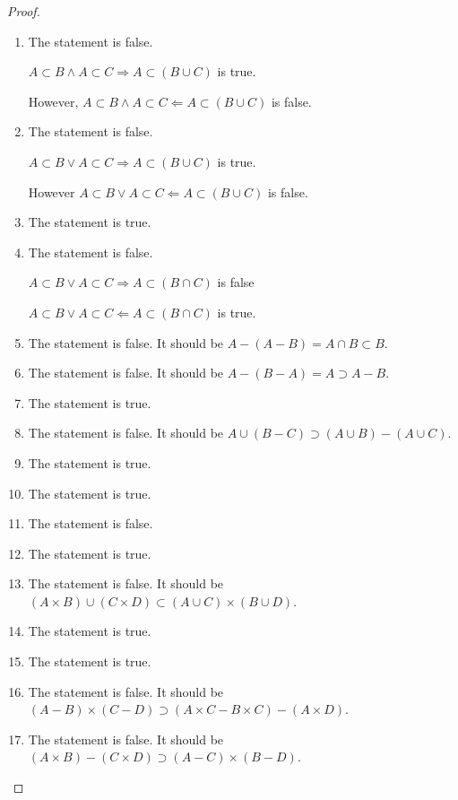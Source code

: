 \begin{proof}
    \begin{enumerate}[label={(\alph*)}]
        \item The statement is false.

              $A\subset B \land A\subset C \Rightarrow A\subset (B\cup C)$ is true.

              However, $A\subset B \land A\subset C \Leftarrow A\subset (B\cup C)$ is false.
        \item The statement is false.

              $A\subset B \lor A\subset C \Rightarrow A\subset (B\cup C)$ is true.

              However $A\subset B \lor A\subset C \Leftarrow A\subset (B\cup C)$ is false.
        \item The statement is true.
        \item The statement is false.

              $A\subset B\lor A\subset C \Rightarrow A\subset (B\cap C)$ is false

              $A\subset B\lor A\subset C \Leftarrow A\subset (B\cap C)$ is true.
        \item The statement is false. It should be $A - (A - B) = A\cap B\subset B$.
        \item The statement is false. It should be $A - (B - A) = A \supset A - B$.
        \item The statement is true.
        \item The statement is false. It should be $A\cup (B - C)\supset (A\cup B) - (A\cup C)$.
        \item The statement is true.
        \item The statement is true.
        \item The statement is false.
        \item The statement is true.
        \item The statement is false. It should be $(A\times B)\cup (C\times D) \subset (A\cup C)\times (B\cup D)$.
        \item The statement is true.
        \item The statement is true.
        \item The statement is false. It should be $(A - B)\times (C - D) \supset (A\times C - B\times C) - (A\times D)$.
        \item The statement is false. It should be $(A\times B) - (C\times D) \supset (A - C)\times (B - D)$.
    \end{enumerate}
\end{proof}

